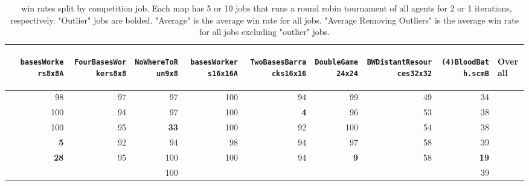 \documentclass{article}
\begin{document}
\begin{table}[H]
    \caption{\agentName\ win rates split by competition job. Each map has 5 or 10 jobs that runs a round robin tournament of all agents for 2 or 1 iterations, respectively. "Outlier" jobs are bolded. "Average" is the average win rate for all jobs. "Average Removing Outliers" is the average win rate for all jobs excluding "outlier" jobs.}
    \label{tab:outlier-winrate}
    \begin{center}
    \begin{tabular}{r|rrrrrrrr|l}
    & \begin{sideways}\texttt{basesWorkers8x8A}\end{sideways} &
    \begin{sideways}\texttt{FourBasesWorkers8x8}\end{sideways} &
    \begin{sideways}\texttt{NoWhereToRun9x8}\end{sideways} &
    \begin{sideways}\texttt{basesWorkers16x16A}\end{sideways} &
    \begin{sideways}\texttt{TwoBasesBarracks16x16}\end{sideways} &
    \begin{sideways}\texttt{DoubleGame24x24}\end{sideways} &
    \begin{sideways}\texttt{BWDistantResources32x32}\end{sideways} &
    \begin{sideways}\texttt{(4)BloodBath.scmB}\end{sideways} & 
    \begin{sideways}Overall\end{sideways}\\
    \midrule
    & 98 & 97 & 97 & 100 & 94 & 99 & 49 & 34 &  \\
    & 100 & 94 & 97 & 100 & \textbf{4} & 96 & 53 & 38 &  \\
    & 100 & 95 & \textbf{33} & 100 & 92 & 100 & 54 & 38 &  \\
    & \textbf{5} & 92 & 94 & 98 & 94 & 97 & 58 & 39 &  \\
    & \textbf{28} & 95 & 100 & 100 & 94 & \textbf{9} & 58 & \textbf{19} &  \\
    & \multicolumn{1}{l}{} & \multicolumn{1}{l}{} & 100 & \multicolumn{1}{l}{} & \multicolumn{1}{l}{} & \multicolumn{1}{l}{} & \multicolumn{1}{l}{} & 39 &  \\

\end{tabular}
\end{center}
\end{table}
\end{document}
